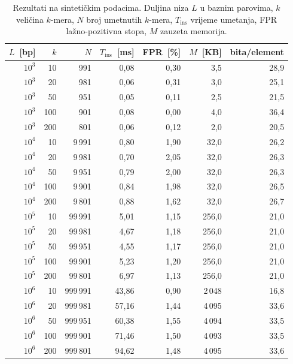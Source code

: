 \documentclass[12pt,a4paper]{article}
\begin{document}
\begin{table}[H]
    \centering
    \caption{Rezultati na sintetičkim podacima. Duljina niza $L$ u baznim parovima,
    $k$ veličina $k$-mera, $N$ broj umetnutih $k$-mera, $T_\text{ins}$ vrijeme
    umetanja, FPR lažno-pozitivna stopa, $M$ zauzeta memorija.}
    \label{tab:synthetic}
    \footnotesize
    \begin{tabular}{r r r r r r r}
        \toprule
        $L$~[bp] & $k$ & $N$ & $T_\text{ins}$~[ms] & FPR~[\%] & $M$~[KB] & bita/element \\
        \midrule
        $10^3$ & 10  & 991    & 0{,}08    & 0{,}30 & 3{,}5   & 28{,}9 \\
        $10^3$ & 20  & 981    & 0{,}06    & 0{,}31 & 3{,}0   & 25{,}1 \\
        $10^3$ & 50  & 951    & 0{,}05    & 0{,}11 & 2{,}5   & 21{,}5 \\
        $10^3$ & 100 & 901    & 0{,}08    & 0{,}00 & 4{,}0   & 36{,}4 \\
        $10^3$ & 200 & 801    & 0{,}06    & 0{,}12 & 2{,}0   & 20{,}5 \\
        \midrule
        $10^4$ & 10  & 9\,991  & 0{,}80    & 1{,}90 & 32{,}0  & 26{,}2 \\
        $10^4$ & 20  & 9\,981  & 0{,}70    & 2{,}05 & 32{,}0  & 26{,}3 \\
        $10^4$ & 50  & 9\,951  & 0{,}79    & 2{,}00 & 32{,}0  & 26{,}3 \\
        $10^4$ & 100 & 9\,901  & 0{,}84    & 1{,}98 & 32{,}0  & 26{,}5 \\
        $10^4$ & 200 & 9\,801  & 0{,}88    & 1{,}62 & 32{,}0  & 26{,}7 \\
        \midrule
        $10^5$ & 10  & 99\,991 & 5{,}01    & 1{,}15 & 256{,}0 & 21{,}0 \\
        $10^5$ & 20  & 99\,981 & 4{,}67    & 1{,}18 & 256{,}0 & 21{,}0 \\
        $10^5$ & 50  & 99\,951 & 4{,}55    & 1{,}17 & 256{,}0 & 21{,}0 \\
        $10^5$ & 100 & 99\,901 & 5{,}23    & 1{,}20 & 256{,}0 & 21{,}0 \\
        $10^5$ & 200 & 99\,801 & 6{,}97    & 1{,}13 & 256{,}0 & 21{,}0 \\
        \midrule
        $10^6$ & 10  & 999\,991  & 43{,}86  & 0{,}90 & 2\,048  & 16{,}8 \\
        $10^6$ & 20  & 999\,981  & 57{,}16  & 1{,}44 & 4\,095  & 33{,}6 \\
        $10^6$ & 50  & 999\,951  & 60{,}38  & 1{,}55 & 4\,094  & 33{,}5 \\
        $10^6$ & 100 & 999\,901  & 71{,}46  & 1{,}50 & 4\,093  & 33{,}5 \\
        $10^6$ & 200 & 999\,801  & 94{,}62  & 1{,}48 & 4\,095  & 33{,}6 \\
        \bottomrule
    \end{tabular}
\end{table}
\end{document}
